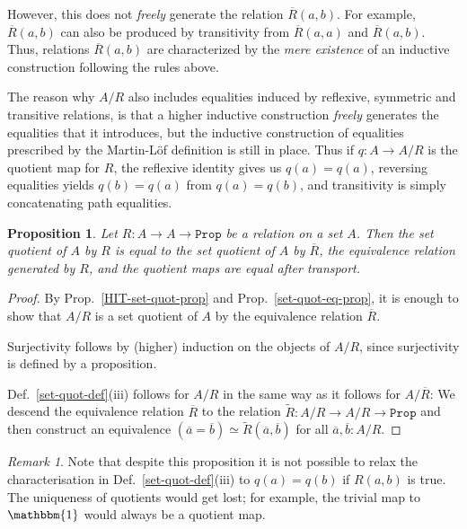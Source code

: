 \documentclass{amsart}
\theoremstyle{plain}
\numberwithin{equation}{section} %
\numberwithin{figure}{section} %
\theoremstyle{plain}
\theoremstyle{plain}
\theoremstyle{plain}
\theoremstyle{plain}
\theoremstyle{plain}
\newtheorem{prop}[thm]{Proposition} %
\theoremstyle{plain}
\theoremstyle{remark}
\newtheorem{rem}[thm]{Remark}
\theoremstyle{remark}
\theoremstyle{remark}
\begin{document}
However, this does not \textit{freely} generate the relation $\overline{R}(a,b)$. For example, $\overline{R}(a,b)$ can also be produced by transitivity from $\overline{R}(a,a)$ and $\overline{R}(a,b)$. Thus, relations $\overline{R}(a,b)$ are characterized by the \textit{mere existence} of an inductive construction following the rules above.

The reason why $A/R$ also includes equalities induced by reflexive, symmetric and transitive relations, is that a higher inductive construction \textit{freely} generates the equalities that it introduces, but the inductive construction of equalities prescribed by the Martin-L\"of definition is still in place. Thus if $q : A \rightarrow A/R$ is the quotient map for $R$, the reflexive identity gives us $q(a) = q(a)$, reversing equalities yields $q(b) = q(a)$ from $q(a) = q(b)$, and transitivity is simply concatenating path equalities.

\begin{prop}  %
Let $R : A \rightarrow A \rightarrow \mathtt{Prop}$ be a relation on a set $A$. Then the set quotient of $A$ by $R$ is equal to the set quotient of $A$ by $\overline{R}$, the equivalence relation generated by $R$, and the quotient maps are equal after transport. 
\end{prop}
\begin{proof}
By Prop.~\ref{HIT-set-quot-prop} and Prop.~\ref{set-quot-eq-prop}, it is enough to show that $A/R$ is a set quotient of $A$ by the equivalence relation $\overline{R}$. 

Surjectivity follows by (higher) induction on the objects of $A/R$, since surjectivity is defined by a proposition.

Def.~\ref{set-quot-def}(iii) follows for $A/R$ in the same way as it follows for $A/\overline{R}$: We descend the equivalence relation $\overline{R}$ to the relation $\widetilde{R} : A/R \rightarrow A/R \rightarrow \mathtt{Prop}$ and then construct an equivalence $(\overline{a} = \overline{b}) \simeq \widetilde{R}(\overline{a}, \overline{b})$ for all $\overline{a}, \overline{b} : A/R$.
\end{proof}

\begin{rem}
Note that despite this proposition it is not possible to relax the characterisation in Def.~\ref{set-quot-def}(iii) to $q(a) = q(b)$ if $R(a, b)$ is true. The uniqueness of quotients would get lost; for example, the trivial map to $\mathbbm{1}$ would always be a quotient map.
\end{rem}
\end{document}
